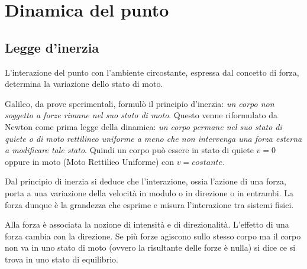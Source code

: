 \documentclass[class=book, crop=false, oneside, 12pt]{standalone}
\begin{document}
\chapter{Dinamica del punto}

\section{Legge d'inerzia}
L'interazione del punto con l'ambiente circostante, espressa dal concetto di forza, determina la variazione dello stato di moto.

Galileo, da prove sperimentali, formulò il principio d'inerzia: \emph{un corpo non soggetto a forze rimane nel suo stato di moto}. 
Questo venne riformulato da Newton come prima legge della dinamica: \emph{un corpo permane nel suo stato di quiete o di moto rettilineo uniforme a meno che non intervenga una forza esterna a modificare tale stato}. 
Quindi un corpo può essere in stato di quiete \(v = 0\) oppure in moto (Moto Rettilieo Uniforme) con \(v = costante\).

Dal principio di inerzia si deduce che l'interazione, ossia l'azione di una forza, porta a una variazione della velocità in modulo o in direzione o in entrambi.
La forza dunque è la grandezza che esprime e misura l'interazione tra sistemi fisici. 

Alla forza è associata la nozione di intensità e di direzionalità.
L'effetto di una forza cambia con la direzione. Se più forze agiscono sullo stesso corpo ma il corpo non va in uno stato di moto (ovvero la risultante delle forze è nulla) si dice ce si trova in uno stato di equilibrio.
\end{document}

